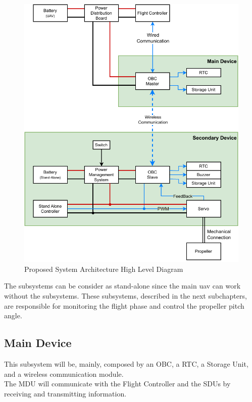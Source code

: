 \begin{figure}[H]
    \centering
    \includegraphics[scale=1]{ch3/assets/system_diagram.pdf}
    \caption{Proposed System Architecture High Level Diagram}
    \label{fig:system_diagram}
\end{figure}

The subsystems can be consider as stand-alone since the main \gls{uav} can work without the subsystems.
These subsystems, described in the next subchapters, are responsible for monitoring the flight phase and control the propeller pitch angle.

\subsection{Main Device}
This subsystem will be, mainly, composed by an \gls{OBC}, a \gls{RTC}, a Storage Unit, and a wireless communication module.\\
The MDU will communicate with the Flight Controller and the SDUs by receiving and transmitting information.

